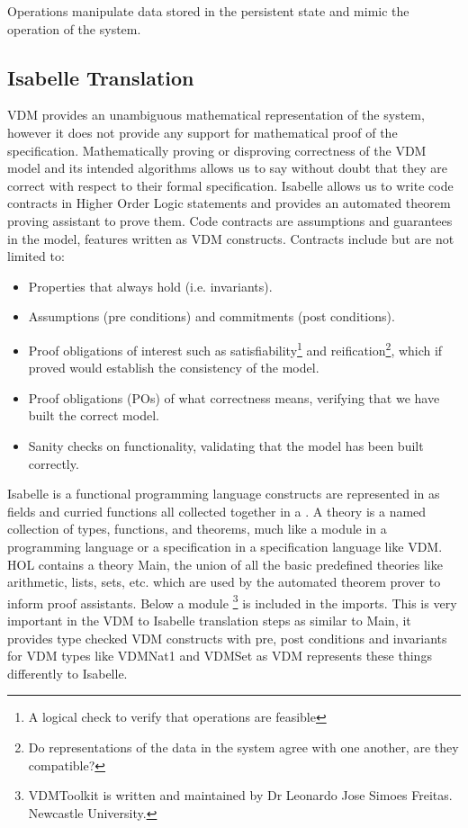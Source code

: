 Operations manipulate data stored in the persistent state and mimic the operation of the system.

\subsection{Isabelle Translation}
VDM provides an unambiguous mathematical representation of the system, however it does not provide any support for mathematical proof of the specification. Mathematically proving or disproving correctness of the VDM model and its intended algorithms allows us to say without doubt that they are correct with respect to their formal specification. Isabelle allows us to write code contracts in Higher Order Logic statements and provides an automated theorem proving assistant to prove them. Code contracts are assumptions and guarantees in the model, features written as VDM constructs. Contracts include but are not limited to: \begin{itemize}
  \item Properties that always hold (i.e. invariants).
  \item Assumptions (pre conditions) and commitments (post conditions).
  \item Proof obligations of interest such as satisfiability\footnote{A logical check to verify that operations are feasible} and reification\footnote{Do representations of the data in the system agree with one another, are they compatible?}, which if proved would establish the consistency of the model.
  \item Proof obligations (POs) of what correctness means, verifying that we have built the correct model.
  \item Sanity checks on functionality, validating that the model has been built correctly.
\end{itemize}
Isabelle is a functional programming language constructs are represented in as fields and curried functions all collected together in a . A theory is a named collection of types, functions, and theorems, much like a module in a programming language or a specification in a specification language like VDM. HOL contains a theory Main, the union of all the basic predefined theories like arithmetic, lists, sets, etc. which are used by the automated theorem prover to inform proof assistants. Below a module \footnote{VDMToolkit is written and maintained by Dr Leonardo Jose Simoes Freitas. Newcastle University.} is included in the imports. This is very important in the VDM to Isabelle translation steps as similar to Main, it provides type checked VDM constructs with pre, post conditions and invariants for VDM types like VDMNat1 and VDMSet as VDM represents these things differently to Isabelle.


